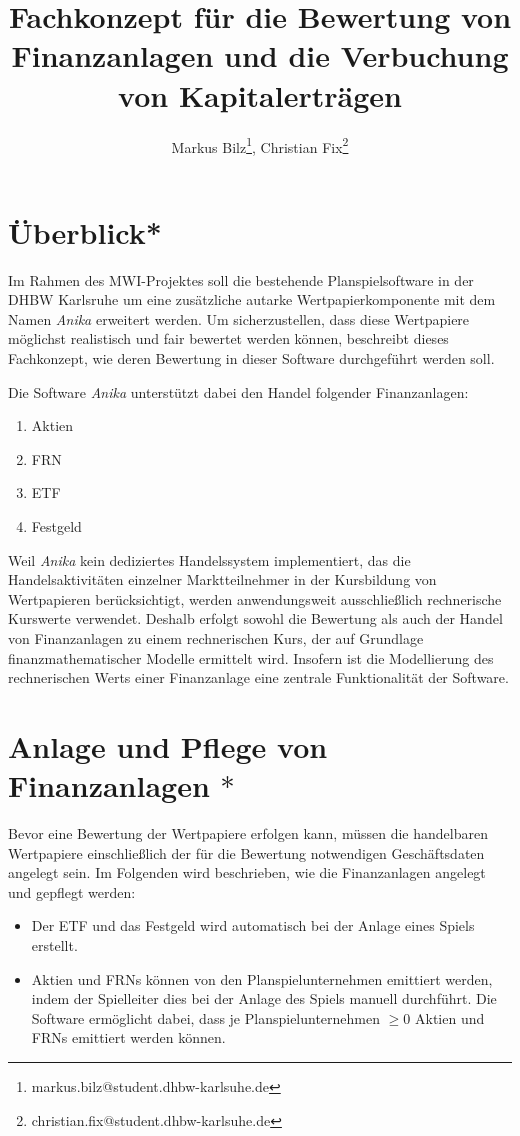 \documentclass[12pt, a4paper]{article}
\title{Fachkonzept für die Bewertung von Finanzanlagen und die Verbuchung von Kapitalerträgen}
\author{Markus Bilz\thanks{markus.bilz@student.dhbw-karlsuhe.de}, Christian Fix\thanks{christian.fix@student.dhbw-karlsuhe.de}}
\begin{document}
\maketitle

\section{Überblick*}
Im Rahmen des MWI-Projektes soll die bestehende Planspielsoftware in der DHBW Karlsruhe um eine zusätzliche autarke Wertpapierkomponente mit dem Namen \textit{Anika} erweitert werden.
Um sicherzustellen, dass diese Wertpapiere möglichst realistisch und fair bewertet werden können, beschreibt dieses Fachkonzept, wie deren Bewertung in dieser Software durchgeführt werden soll.

Die Software \textit{Anika} unterstützt dabei den Handel folgender Finanzanlagen:
\begin{enumerate}
	\item Aktien
	\item \gls{FRN}
	\item \gls{ETF}
	\item Festgeld
\end{enumerate}

Weil \textit{Anika} kein dediziertes Handelssystem implementiert, das die Handelsaktivitäten einzelner Marktteilnehmer in der Kursbildung von Wertpapieren berücksichtigt, werden anwendungsweit ausschließlich rechnerische Kurswerte verwendet. 
Deshalb erfolgt sowohl die Bewertung als auch der Handel von Finanzanlagen zu einem rechnerischen Kurs, der auf Grundlage finanzmathematischer Modelle ermittelt wird.
Insofern ist die Modellierung des rechnerischen Werts einer Finanzanlage eine zentrale Funktionalität der Software.


\section{Anlage und Pflege von Finanzanlagen $\ast$}
\label{sec:anlage_und_pflege_der_wertpapiere}

Bevor eine Bewertung der Wertpapiere erfolgen kann, müssen die handelbaren Wertpapiere einschließlich der für die Bewertung notwendigen Geschäftsdaten angelegt sein. 
Im Folgenden wird beschrieben, wie die Finanzanlagen angelegt und gepflegt werden:
\begin{itemize}
	\item Der \gls{ETF} und das Festgeld wird automatisch bei der Anlage eines Spiels erstellt.
	\item Aktien und \glspl{FRN} können von den Planspielunternehmen emittiert werden, indem der Spielleiter dies bei der Anlage des Spiels manuell durchführt. Die Software ermöglicht dabei, dass je Planspielunternehmen $\geq 0$ Aktien und \glspl{FRN} emittiert werden können. 
\end{itemize}
\end{document}
